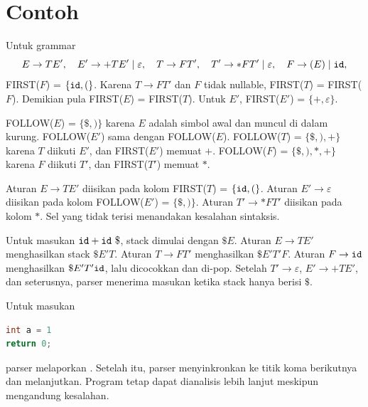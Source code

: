 \section*{Contoh}

\begin{contoh}
Untuk grammar
\[
E \to T E', \quad E' \to + T E' \mid \varepsilon, \quad
T \to F T', \quad T' \to * F T' \mid \varepsilon, \quad
F \to (E) \mid \texttt{id},
\]
FIRST(\(F\)) = \(\{\texttt{id}, (\}\). Karena \(T \to F T'\) dan
\(F\) tidak nullable, FIRST(\(T\)) = FIRST(\(F\)). Demikian pula
FIRST(\(E\)) = FIRST(\(T\)). Untuk \(E'\), FIRST(\(E'\)) =
\(\{+, \varepsilon\}\).
\end{contoh}

\begin{contoh}
FOLLOW(\(E\)) = \(\{\$, )\}\) karena \(E\) adalah simbol awal dan
muncul di dalam kurung. FOLLOW(\(E'\)) sama dengan FOLLOW(\(E\)).
FOLLOW(\(T\)) = \(\{\$, ), +\}\) karena \(T\) diikuti \(E'\), dan
FIRST(\(E'\)) memuat \(+\). FOLLOW(\(F\)) = \(\{\$, ), *, +\}\)
karena \(F\) diikuti \(T'\), dan FIRST(\(T'\)) memuat \(*\).
\end{contoh}

\begin{contoh}
Aturan \(E \to T E'\) diisikan pada kolom FIRST(\(T\)) =
\(\{\texttt{id}, (\}\). Aturan \(E' \to \varepsilon\) diisikan pada
kolom FOLLOW(\(E'\)) = \(\{\$, )\}\). Aturan
\(T' \to * F T'\) diisikan pada kolom \(*\). Sel yang tidak terisi
menandakan kesalahan sintaksis.
\end{contoh}

\begin{contoh}
Untuk masukan \(\code{id} + \code{id}\ \$\), stack dimulai dengan
\(\$E\). Aturan \(E \to TE'\) menghasilkan stack \(\$E'T\).
Aturan \(T \to FT'\) menghasilkan \(\$E'T'F\). Aturan
\(F \to \texttt{id}\) menghasilkan \(\$E'T'\texttt{id}\), lalu
 dicocokkan dan di-pop. Setelah \(T' \to \varepsilon\),
\(E' \to +TE'\), dan seterusnya, parser menerima masukan ketika
stack hanya berisi \(\$\).
\end{contoh}

\begin{contoh}
Untuk masukan
\begin{lstlisting}[language=C]
int a = 1
return 0;
\end{lstlisting}
parser melaporkan . Setelah itu, parser menyinkronkan
ke titik koma berikutnya dan melanjutkan. Program tetap dapat
dianalisis lebih lanjut meskipun mengandung kesalahan.
\end{contoh}
